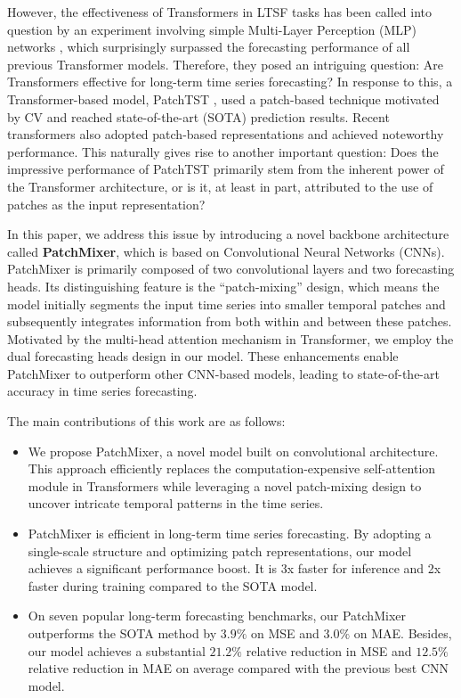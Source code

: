 \documentclass{article} \usepackage{iclr2024_conference,times}
\begin{document}
However, the effectiveness of Transformers in LTSF tasks has been called into question by an experiment involving simple Multi-Layer Perception (MLP) networks \citep{dlinear}, which surprisingly surpassed the forecasting performance of all previous Transformer models. 
Therefore, they posed an intriguing question: Are Transformers effective for long-term time series forecasting? 
In response to this, a Transformer-based model, PatchTST \citep{patchtst}, used a patch-based technique motivated by CV and reached state-of-the-art (SOTA) prediction results. 
Recent transformers \citep{crossformer, petformer} also adopted patch-based representations and achieved noteworthy performance. This naturally gives rise to another important question: Does the impressive performance of PatchTST primarily stem from the inherent power of the Transformer architecture, or is it, at least in part, attributed to the use of patches as the input representation?


In this paper, we address this issue by introducing a novel backbone architecture called \textbf{PatchMixer}, which is based on Convolutional Neural Networks (CNNs). PatchMixer is primarily composed of two convolutional layers and two forecasting heads. 
Its distinguishing feature is the ``patch-mixing'' design, which means the model initially segments the input time series into smaller temporal patches and subsequently integrates information from both within and between these patches. Motivated by the multi-head attention mechanism in Transformer, we employ the dual forecasting heads design in our model. These enhancements enable PatchMixer to outperform other CNN-based models, leading to state-of-the-art accuracy in time series forecasting.


The main contributions of this work are as follows:

\vspace{-5pt}
\begin{itemize}
  \item We propose PatchMixer, a novel model built on convolutional architecture. This approach efficiently replaces the computation-expensive self-attention module in Transformers while leveraging a novel patch-mixing design to uncover intricate temporal patterns in the time series.
  \item PatchMixer is efficient in long-term time series forecasting. By adopting a single-scale structure and optimizing patch representations, our model achieves a significant performance boost. It is 3x faster for inference and 2x faster during training compared to the SOTA model. 
  \item  On seven popular long-term forecasting benchmarks, our PatchMixer outperforms the
SOTA method by $\mathbf{3.9\%}$ on MSE and $\mathbf{3.0\%}$ on MAE. Besides, our model achieves a substantial $\mathbf{21.2\%}$ relative reduction in MSE and $\mathbf{12.5\%}$ relative reduction in MAE on average compared with the previous best CNN model.
\end{itemize}
\end{document}
